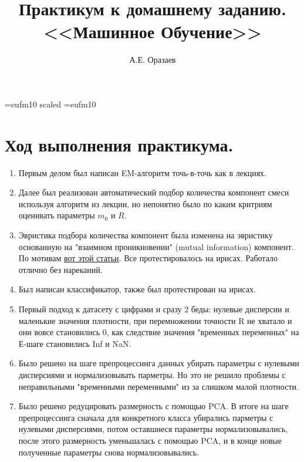 \documentclass[12pt]{article}
\title{\bf Практикум к домашнему заданию. \\ <<Машинное
Обучение>>}
\author{А.Е. Оразаев}
\date{}
\begin{document}
\voffset=-20mm
\hoffset=-12mm
\font\Got=eufm10 scaled \font\Got=eufm10

\maketitle

\section{Ход выполнения практикума.}

\begin{enumerate}
    \item Первым делом был написан EM-алгоритм точь-в-точь как в лекциях.

    \item Далее был реализован автоматический подбор количества
          компонент смеси используя алгоритм из лекции, но непонятно было
          по каким критриям оценивать параметры $m_0$ и $R$.

    \item Эвристика подбора количества компонент была изменена на 
          эвристику основанную на "взаимном проникновении" (mutual information)
          компонент. По мотивам \href{http://www.google.ru/url?sa=t&rct=j&q=&esrc=s&source=web&cd=1&ved=0CDEQFjAA&url=http%3A%2F%2Fciteseerx.ist.psu.edu%2Fviewdoc%2Fdownload%3Fdoi%3D10.1.1.109.8192%26rep%3Drep1%26type%3Dpdf&ei=oXtTUeqCBcaS4ATEyoB4&usg=AF    QjCNFXjHdfDggeWS7WSAB5EAB731oluw&bvm=bv.44342787,d.bGE&cad=rjt}{вот этой статьи}.  Все протестировалось на ирисах. Работало отлично без нареканий.

    \item Был написан классификатор, также был протестирован на ирисах.

    \item Первый подход к датасету с цифрами и сразу 2 беды: нулевые дисперсии
          и маленькие значения плотности, при перемножении точности R не
          хватало и они вовсе становились 0, как следствие значения
          "временных переменных" на Е-шаге становились Inf и NaN.

    \item Было решено на шаге препроцессинга данных убирать параметры с нулевыми
          дисперсиями и нормализовывать парметры. Но это не решило проблемы
          с неправильными "временными переменными" из за слишком малой плотности.

    \item Было решено редуцировать размерность с помощью PCA. В итоге на шаге
          препроцессинга сначала для конкретного класса убирались парметры
          с нулевыми дисперсиями, потом оставшиеся параметры нормализовывались,
          после этого размерность уменьшалась с помощью PCA, и в конце новые
          полученные параметры снова нормализовывались.


\end{enumerate}
\end{document}

